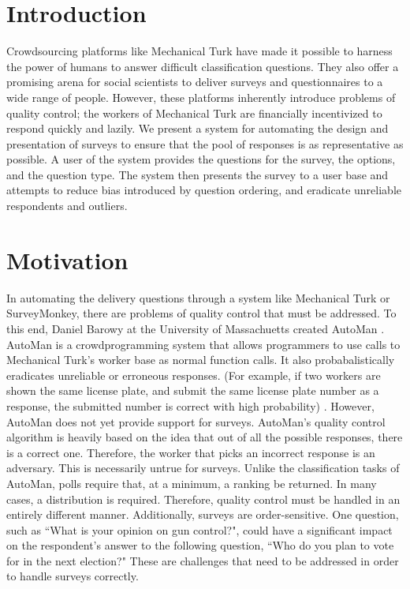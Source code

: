 \documentclass{article}
\begin{document}
\section{Introduction}
Crowdsourcing platforms like Mechanical Turk have made it possible to harness the power of humans to answer difficult classification questions. They also offer a promising arena for social scientists to deliver surveys and questionnaires to a wide range of people. However, these platforms inherently introduce problems of quality control; the workers of Mechanical Turk are financially incentivized to respond quickly and lazily. We present a system for automating the design and presentation of surveys to ensure that the pool of responses is as representative as possible. A user of the system provides the questions for the survey, the options, and the question type. The system then presents the survey to a user base and attempts to reduce bias introduced by question ordering, and eradicate unreliable respondents and outliers.
\section{Motivation}
In automating the delivery questions through a system like Mechanical Turk or SurveyMonkey, there are problems of quality control that must be addressed. To this end, Daniel Barowy at the University of Massachuetts created AutoMan \cite{automan}. AutoMan is a crowdprogramming system that allows programmers to use calls to Mechanical Turk's worker base as normal function calls. It also probabalistically eradicates unreliable or erroneous responses. (For example, if two workers are shown the same license plate, and submit the same license plate number as a response, the submitted number is correct with high probability) \cite{automan}. However, AutoMan does not yet provide support for surveys. AutoMan's quality control algorithm is heavily based on the idea that out of all the possible responses, there is a correct one. Therefore, the worker that picks an incorrect response is an adversary. This is necessarily untrue for surveys. Unlike the classification tasks of AutoMan, polls require that, at a minimum, a ranking be returned. In many cases, a distribution is required. Therefore, quality control must be handled in an entirely different manner. Additionally, surveys are order-sensitive. One question, such as ``What is your opinion on gun control?", could have a significant impact on the respondent's answer to the following question, ``Who do you plan to vote for in the next election?" These are challenges that need to be addressed in order to handle surveys correctly.
\end{document}
